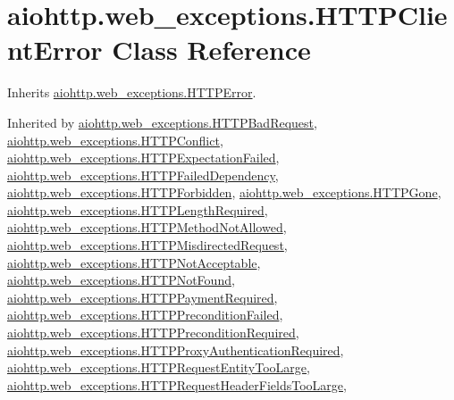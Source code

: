 \hypertarget{classaiohttp_1_1web__exceptions_1_1_h_t_t_p_client_error}{}\section{aiohttp.\+web\+\_\+exceptions.\+H\+T\+T\+P\+Client\+Error Class Reference}
\label{classaiohttp_1_1web__exceptions_1_1_h_t_t_p_client_error}


Inherits \hyperlink{classaiohttp_1_1web__exceptions_1_1_h_t_t_p_error}{aiohttp.\+web\+\_\+exceptions.\+H\+T\+T\+P\+Error}.



Inherited by \hyperlink{classaiohttp_1_1web__exceptions_1_1_h_t_t_p_bad_request}{aiohttp.\+web\+\_\+exceptions.\+H\+T\+T\+P\+Bad\+Request}, \hyperlink{classaiohttp_1_1web__exceptions_1_1_h_t_t_p_conflict}{aiohttp.\+web\+\_\+exceptions.\+H\+T\+T\+P\+Conflict}, \hyperlink{classaiohttp_1_1web__exceptions_1_1_h_t_t_p_expectation_failed}{aiohttp.\+web\+\_\+exceptions.\+H\+T\+T\+P\+Expectation\+Failed}, \hyperlink{classaiohttp_1_1web__exceptions_1_1_h_t_t_p_failed_dependency}{aiohttp.\+web\+\_\+exceptions.\+H\+T\+T\+P\+Failed\+Dependency}, \hyperlink{classaiohttp_1_1web__exceptions_1_1_h_t_t_p_forbidden}{aiohttp.\+web\+\_\+exceptions.\+H\+T\+T\+P\+Forbidden}, \hyperlink{classaiohttp_1_1web__exceptions_1_1_h_t_t_p_gone}{aiohttp.\+web\+\_\+exceptions.\+H\+T\+T\+P\+Gone}, \hyperlink{classaiohttp_1_1web__exceptions_1_1_h_t_t_p_length_required}{aiohttp.\+web\+\_\+exceptions.\+H\+T\+T\+P\+Length\+Required}, \hyperlink{classaiohttp_1_1web__exceptions_1_1_h_t_t_p_method_not_allowed}{aiohttp.\+web\+\_\+exceptions.\+H\+T\+T\+P\+Method\+Not\+Allowed}, \hyperlink{classaiohttp_1_1web__exceptions_1_1_h_t_t_p_misdirected_request}{aiohttp.\+web\+\_\+exceptions.\+H\+T\+T\+P\+Misdirected\+Request}, \hyperlink{classaiohttp_1_1web__exceptions_1_1_h_t_t_p_not_acceptable}{aiohttp.\+web\+\_\+exceptions.\+H\+T\+T\+P\+Not\+Acceptable}, \hyperlink{classaiohttp_1_1web__exceptions_1_1_h_t_t_p_not_found}{aiohttp.\+web\+\_\+exceptions.\+H\+T\+T\+P\+Not\+Found}, \hyperlink{classaiohttp_1_1web__exceptions_1_1_h_t_t_p_payment_required}{aiohttp.\+web\+\_\+exceptions.\+H\+T\+T\+P\+Payment\+Required}, \hyperlink{classaiohttp_1_1web__exceptions_1_1_h_t_t_p_precondition_failed}{aiohttp.\+web\+\_\+exceptions.\+H\+T\+T\+P\+Precondition\+Failed}, \hyperlink{classaiohttp_1_1web__exceptions_1_1_h_t_t_p_precondition_required}{aiohttp.\+web\+\_\+exceptions.\+H\+T\+T\+P\+Precondition\+Required}, \hyperlink{classaiohttp_1_1web__exceptions_1_1_h_t_t_p_proxy_authentication_required}{aiohttp.\+web\+\_\+exceptions.\+H\+T\+T\+P\+Proxy\+Authentication\+Required}, \hyperlink{classaiohttp_1_1web__exceptions_1_1_h_t_t_p_request_entity_too_large}{aiohttp.\+web\+\_\+exceptions.\+H\+T\+T\+P\+Request\+Entity\+Too\+Large}, \hyperlink{classaiohttp_1_1web__exceptions_1_1_h_t_t_p_request_header_fields_too_large}{aiohttp.\+web\+\_\+exceptions.\+H\+T\+T\+P\+Request\+Header\+Fields\+Too\+Large}, 